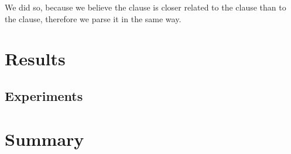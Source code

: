 \noindent{}We did so, because we believe the  clause is closer
related to the  clause than to the 
clause, therefore we parse it in the same way.

\chapter{Results\revision}
\label{chap:Results}

\section{Experiments}

\chapter*{Summary\revision}



